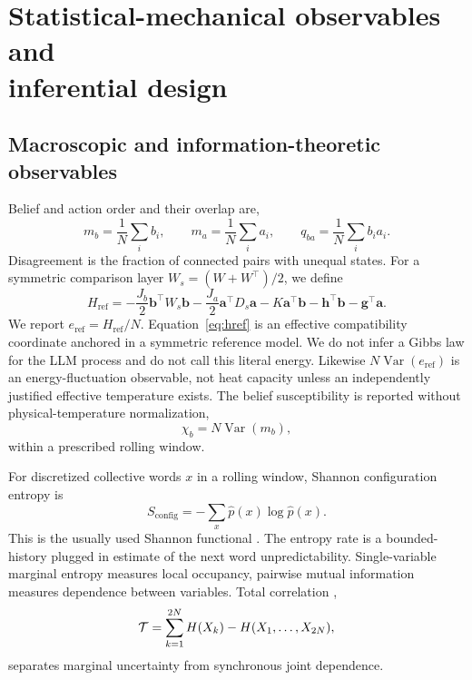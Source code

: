 \documentclass[12pt]{article}
\begin{document}
\section{Statistical-mechanical observables and\texorpdfstring{\\}{ }inferential design}
\label{sec:observables-inference}

\subsection{Macroscopic and information-theoretic observables}
\label{sec:order-compatibility}

Belief and action order and their overlap are,
\begin{equation}
m_b=\frac{1}{N}\sum_i b_i,\qquad
m_a=\frac{1}{N}\sum_i a_i,\qquad
q_{ba}=\frac{1}{N}\sum_i b_i a_i.
\end{equation}
Disagreement is the fraction of connected pairs with unequal states.  For a
symmetric comparison layer $W_s=(W+W^\top)/2$, we define
\begin{equation}
H_{\mathrm{ref}}=-\frac{J_b}{2}\bm b^\top W_s\bm b
-\frac{J_a}{2}\bm a^\top D_s\bm a
-K\bm a^\top\bm b-\bm h^\top\bm b-\bm g^\top\bm a .
\label{eq:href}
\end{equation}
We report $e_{\mathrm{ref}}=H_{\mathrm{ref}}/N$.  Equation~\eqref{eq:href} is
an effective compatibility coordinate anchored in a
symmetric reference model.  We do not infer a Gibbs law for the LLM process
and do not call this literal energy.  Likewise
$N\operatorname{Var}(e_{\mathrm{ref}})$ is an energy-fluctuation observable,
not heat capacity unless an independently justified effective temperature
exists.
The belief susceptibility is reported without physical-temperature
normalization,
\begin{equation}
\chi_b=N\operatorname{Var}(m_b),
\end{equation}
within a prescribed rolling window.

For discretized collective words $x$ in a rolling window, Shannon
configuration
entropy is
\begin{equation}
S_{\mathrm{config}}=-\sum_x \hat p(x)\log\hat p(x).
\end{equation}
This is the usually used Shannon functional \cite{shannon1948}.
The entropy rate is a bounded-history plugged in estimate of the next word
unpredictability.  Single-variable marginal entropy measures local occupancy,
pairwise mutual information measures dependence between variables.  Total
correlation \cite{watanabe1960},
\begin{equation}
{\cal T}=\sum_{k=1}^{2N}H(X_k)-H(X_1,\ldots,X_{2N}),
\end{equation}
separates marginal uncertainty from synchronous joint dependence.
\end{document}
